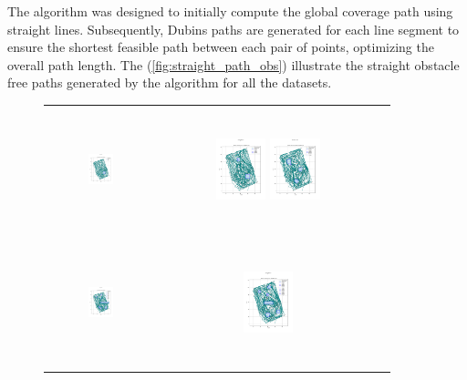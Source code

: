 \vspace*{6mm} 

The algorithm was designed to initially compute the global coverage path using straight lines. Subsequently, Dubins paths are generated for each line segment to ensure the shortest feasible path between each pair of points, optimizing the overall path length. The (\autoref{fig:straight_path_obs}) illustrate the straight obstacle free paths generated by the algorithm for all the datasets.

\begin{figure}[]
    \centering
    \begin{tabular}{ccc} 
         \includegraphics[height=36mm,width=0.24\textwidth]{Images/simulation_obs/obs_straight/1.png}
        & \includegraphics[height=36mm,width=0.24\textwidth]{Images/simulation_obs/obs_straight/2.png}
         \includegraphics[height=36mm,width=0.24\textwidth]{Images/simulation_obs/obs_straight/3.png}\\[-4pt]

        \includegraphics[height=36mm,width=0.24\textwidth]{Images/simulation_obs/obs_straight/4.png}
        & \includegraphics[height=36mm,width=0.24\textwidth]{Images/simulation_obs/obs_straight/5.png} 


\end{tabular}
\end{figure}
